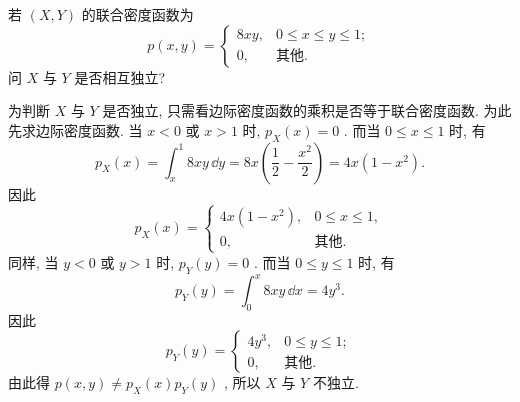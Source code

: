    \begin{example}\label{exam:3.2.7}
   	若 $(X,Y)$ 的联合密度函数为
   	\begin{equation*}
   		p(x,y)=
   		\begin{cases}
   		8xy, & 0\leqslant x\leqslant y\leqslant1;\\
   		0, & \text{其他}.
   		\end{cases}
   	\end{equation*}
   	问 $X$ 与 $Y$ 是否相互独立?
   \end{example}
   \begin{solution}
   	为判断 $X$ 与 $Y$ 是否独立, 只需看边际密度函数的乘积是否等于联合密度函数. 为此先求边际密度函数.
   	当 $x<0$ 或 $x>1$ 时, $p_{X}(x)=0$ . 而当 $0\leqslant x\leqslant1$ 时, 有
   	\begin{equation*}
   		p_{X}(x)=\int_{x}^{1}8xy\,\dd y=8x\left(\frac{1}{2}-\frac{x^2}{2}\right)=4x\left(1-x^2\right).
   	\end{equation*}
   	因此
   	\begin{equation*}
   		p_{X}(x)=
   		\begin{cases}
   		4x\left(1-x^2\right), & 0\leqslant x\leqslant1,\\
   		0, & \text{其他}.
   		\end{cases}
   	\end{equation*}
   	同样, 当 $y<0$ 或 $y>1$ 时, $p_{Y}(y)=0$ . 而当 $0\leqslant y\leqslant 1$ 时, 有
   	\begin{equation*}
   		p_{Y}(y)=\int_{0}^{x}8xy\,\dd x=4y^3.
   	\end{equation*}
   	因此
   	\begin{equation*}
   		p_{Y}(y)=
   		\begin{cases}
   		4y^3, & 0\leqslant y\leqslant1;\\
   		0, & \text{其他}.
   		\end{cases}
   	\end{equation*}
   	由此得 $p(x,y)\ne p_{X}(x)p_{Y}(y)$ , 所以 $X$ 与 $Y$ 不独立.
   \end{solution}

